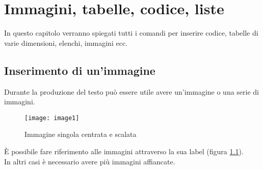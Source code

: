 \chapter{Immagini, tabelle, codice, liste}
In questo capitolo verranno spiegati tutti i comandi per inserire codice, tabelle di varie dimensioni, elenchi, immagini ecc.

\section{Inserimento di un'immagine}
Durante la produzione del testo può essere utile avere un'immagine o una serie di immagini.
\begin{figure}[H]
	\centering
	\texttt{[image: image1]} %
	\caption{Immagine singola centrata e scalata}
	\label{capitolo2:image1}
\end{figure}
È possibile fare riferimento alle immagini attraverso la sua label (figura \ref{capitolo2:image1}).\\   %
In altri casi è necessario avere più immagini affiancate.